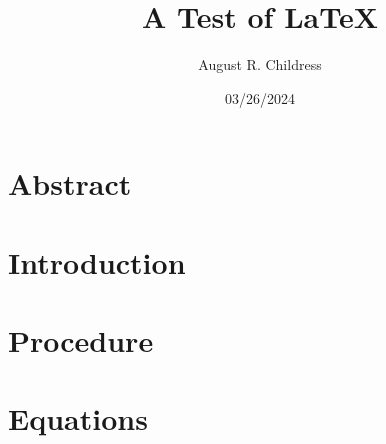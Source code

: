 \documentclass{article}
\author{August R. Childress}
\title{A Test of LaTeX}
\date{03/26/2024}
\begin{document}
\maketitle

\section{Abstract}


\section{Introduction}


\section{Procedure}

\section{Equations}







\end{document}
